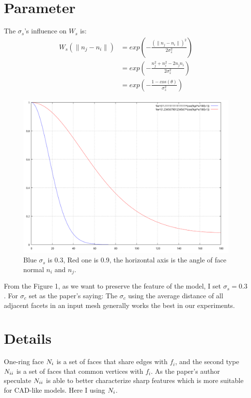 \documentclass{article}
\theoremstyle{definition}
\theoremstyle{remark}
\newcommand{\rom}[1]{\uppercase\expandafter{\romannumeral #1\relax}}
\begin{document}
\section{Parameter}
The $\sigma_s$'s influence on $W_s$ is:
\begin{equation}
  \begin{aligned}
      W_s(\parallel n_j-n_i \parallel) &= exp(-\frac{(\parallel n_j-n_i \parallel)^2} {2\sigma_s^2})\\
      &= exp(-\frac{n_j^2 + n_i^2  - 2n_jn_i} {2\sigma_s^2}) \\
      &=exp(-\frac{1-cos(\theta)} {\sigma_s^2})
   \end{aligned}
\end{equation}
\begin{figure}[H]
\includegraphics[width=12cm]{theta_inf}
 \caption[The $\sigma_s$'s influence on $W_s$]
   {Blue $\sigma_s$ is 0.3, Red one is 0.9, the horizontal axis is the angle of face normal $n_i$ and $n_j$.}
\centering
\end{figure}
From the Figure 1, as we want to preserve the feature of the model, I set $\sigma_s = 0.3$. For $\sigma_c$ set as the paper's saying: The $\sigma_c$  using the average distance of all adjacent facets in an input mesh generally works the best in our experiments.
\section{Details}
One-ring face $N_{\rom{1}}$ is a set of faces that share edges with $f_i$, and the second type $N_{\rom{2}}$ is a set of faces that common vertices with $f_i$. As the paper's author speculate $N_{\rom{2}}$ is able to better characterize sharp features which is more suitable for CAD-like models. Here I using $N_{\rom{1}}$.
\end{document}
